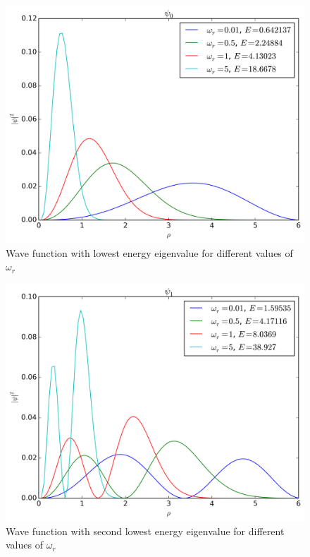 \documentclass[11pt,a4paper,english,draft]{article}
\numberwithin{equation}{section}
\newcommand{\figurewidth}{.85\textwidth}
\begin{document}
\begin{figure}
\centering
\includegraphics[width=\figurewidth]{../results/psi_compare_omegar0.png}
\caption{Wave function with lowest energy eigenvalue
for different values of $\omega_r$}
\label{fig:omegar0}
\end{figure}

\begin{figure}
\centering
\includegraphics[width=\figurewidth]{../results/psi_compare_omegar1.png}
\caption{Wave function with second lowest energy eigenvalue
for different values of $\omega_r$}
\label{fig:omegar1}
\end{figure}
\end{document}
